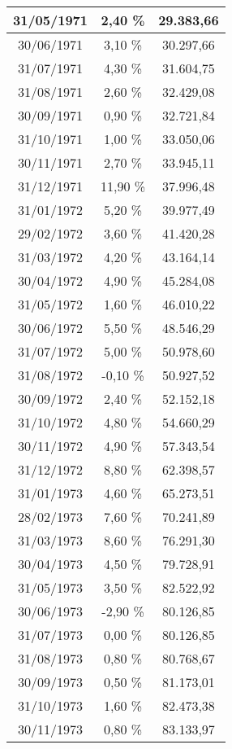 \begin{center}
\begin{longtable}{|c|c|c|}
31/05/1971 & 2,40 \% & 29.383,66  \\ \hline
30/06/1971 & 3,10 \% & 30.297,66  \\ \hline
31/07/1971 & 4,30 \% & 31.604,75  \\ \hline
31/08/1971 & 2,60 \% & 32.429,08  \\ \hline
30/09/1971 & 0,90 \% & 32.721,84  \\ \hline
31/10/1971 & 1,00 \% & 33.050,06  \\ \hline
30/11/1971 & 2,70 \% & 33.945,11  \\ \hline
31/12/1971 & 11,90 \% & 37.996,48  \\ \hline
31/01/1972 & 5,20 \% & 39.977,49  \\ \hline
29/02/1972 & 3,60 \% & 41.420,28  \\ \hline
31/03/1972 & 4,20 \% & 43.164,14  \\ \hline
30/04/1972 & 4,90 \% & 45.284,08  \\ \hline
31/05/1972 & 1,60 \% & 46.010,22  \\ \hline
30/06/1972 & 5,50 \% & 48.546,29  \\ \hline
31/07/1972 & 5,00 \% & 50.978,60  \\ \hline
31/08/1972 & -0,10 \% & 50.927,52  \\ \hline
30/09/1972 & 2,40 \% & 52.152,18  \\ \hline
31/10/1972 & 4,80 \% & 54.660,29  \\ \hline
30/11/1972 & 4,90 \% & 57.343,54  \\ \hline
31/12/1972 & 8,80 \% & 62.398,57  \\ \hline
31/01/1973 & 4,60 \% & 65.273,51  \\ \hline
28/02/1973 & 7,60 \% & 70.241,89  \\ \hline
31/03/1973 & 8,60 \% & 76.291,30  \\ \hline
30/04/1973 & 4,50 \% & 79.728,91  \\ \hline
31/05/1973 & 3,50 \% & 82.522,92  \\ \hline
30/06/1973 & -2,90 \% & 80.126,85  \\ \hline
31/07/1973 & 0,00 \% & 80.126,85  \\ \hline
31/08/1973 & 0,80 \% & 80.768,67  \\ \hline
30/09/1973 & 0,50 \% & 81.173,01  \\ \hline
31/10/1973 & 1,60 \% & 82.473,38  \\ \hline
30/11/1973 & 0,80 \% & 83.133,97  \\ \hline

\end{longtable}
\end{center}
